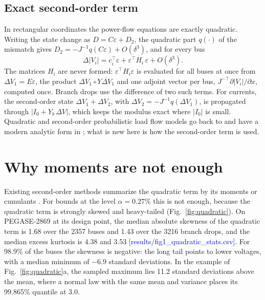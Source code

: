 \documentclass[preprint,12pt]{elsarticle}
\newcommand{\src}[1]{\textcolor{blue}{[#1]}}          %
\begin{document}
\subsection{Exact second-order term}
In rectangular coordinates the power-flow equations are exactly quadratic. Writing the state change as
$D = C\varepsilon + D_2$, the quadratic part $q(\cdot)$ of the mismatch gives
$D_2 = -J^{-1} q(C\varepsilon) + O(\delta^3)$, and for every bus
\begin{equation}\label{eq:second}
\Delta|V_i| = c_i^\top\varepsilon + \varepsilon^\top H_i\,\varepsilon + O(\delta^3).
\end{equation}
The matrices $H_i$ are never formed: $\varepsilon^\top H_i\varepsilon$ is evaluated for all buses at once from
$\Delta V_1 = E\varepsilon$, the product $\Delta V_1\circ\overline{Y\Delta V_1}$ and one adjoint vector per bus,
$J^{-\top}\partial|V_i|/\partial x$, computed once. Branch drops use the difference of two such terms. For currents,
the second-order state $\Delta V_1 + \Delta V_2$, with $\Delta V_2 = -J^{-1}q(\Delta V_1)$, is propagated through
$|I_0 + Y_b\,\Delta V|$, which keeps the modulus exact where $|I_0|$ is small. Quadratic and second-order
probabilistic load flow models go back to \cite{brucoli1985quadratic} and have a modern analytic form in
\cite{sandoval2022second}; what is new here is how the second-order term is used.

\section{Why moments are not enough}\label{sec:why}
Existing second-order methods summarize the quadratic term by its moments or cumulants
\cite{brucoli1985quadratic,sandoval2022second,liu2018holomorphic}. For bounds at the level $\alpha = 0.27\%$ this is
not enough, because the quadratic term is strongly skewed and heavy-tailed (Fig.~\ref{fig:quadratic}). On PEGASE-2869
at its design point, the median absolute skewness of the quadratic term is 1.68 over the 2357 buses and 1.43 over the
3216 branch drops, and the median excess kurtosis is 4.38 and 3.53 \src{results/fig1\_quadratic\_stats.csv}. For
98.9\% of the buses the skewness is negative: the long tail points to lower voltages, with a median minimum of
$-6.9$ standard deviations. In the example of Fig.~\ref{fig:quadratic}a, the sampled maximum lies 11.2 standard
deviations above the mean, where a normal law with the same mean and variance places its 99.865\% quantile at 3.0.
\end{document}
